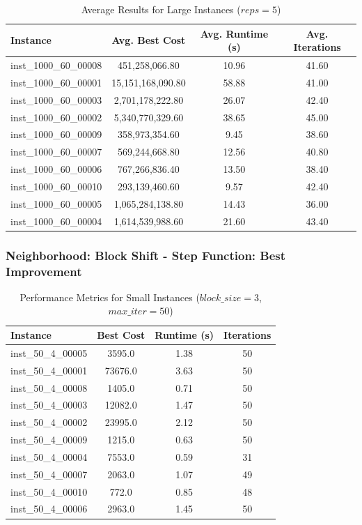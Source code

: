 \documentclass{article}
\begin{document}
\begin{table}[H]
\centering
\caption{Average Results for Large Instances ($reps=5$)}
\begin{tabular}{lccc}
\toprule
\textbf{Instance} & \textbf{Avg. Best Cost} & \textbf{Avg. Runtime (s)} & \textbf{Avg. Iterations} \\
\midrule
inst\_1000\_60\_00008 & 451,258,066.80  & 10.96 & 41.60 \\
inst\_1000\_60\_00001 & 15,151,168,090.80 & 58.88 & 41.00 \\
inst\_1000\_60\_00003 & 2,701,178,222.80  & 26.07 & 42.40 \\
inst\_1000\_60\_00002 & 5,340,770,329.60  & 38.65 & 45.00 \\
inst\_1000\_60\_00009 & 358,973,354.60    & 9.45  & 38.60 \\
inst\_1000\_60\_00007 & 569,244,668.80    & 12.56 & 40.80 \\
inst\_1000\_60\_00006 & 767,266,836.40    & 13.50 & 38.40 \\
inst\_1000\_60\_00010 & 293,139,460.60    & 9.57  & 42.40 \\
inst\_1000\_60\_00005 & 1,065,284,138.80  & 14.43 & 36.00 \\
inst\_1000\_60\_00004 & 1,614,539,988.60  & 21.60 & 43.40 \\
\bottomrule
\end{tabular}
\label{tab:avg_results_1000_60}
\end{table}

\subsubsection*{Neighborhood: Block Shift - Step Function: Best Improvement}

\begin{table}[H]
\centering
\caption{Performance Metrics for Small Instances ($block\_size=3$, $max\_iter=50$)}
\begin{tabular}{lccc}
\toprule
\textbf{Instance} & \textbf{Best Cost} & \textbf{Runtime (s)} & \textbf{Iterations} \\
\midrule
inst\_50\_4\_00005 & 3595.0  & 1.38 & 50 \\
inst\_50\_4\_00001 & 73676.0 & 3.63 & 50 \\
inst\_50\_4\_00008 & 1405.0  & 0.71 & 50 \\
inst\_50\_4\_00003 & 12082.0 & 1.47 & 50 \\
inst\_50\_4\_00002 & 23995.0 & 2.12 & 50 \\
inst\_50\_4\_00009 & 1215.0  & 0.63 & 50 \\
inst\_50\_4\_00004 & 7553.0  & 0.59 & 31 \\
inst\_50\_4\_00007 & 2063.0  & 1.07 & 49 \\
inst\_50\_4\_00010 & 772.0   & 0.85 & 48 \\
inst\_50\_4\_00006 & 2963.0  & 1.45 & 50 \\
\bottomrule
\end{tabular}
\label{tab:performance_metrics_50_4}
\end{table}
\end{document}
